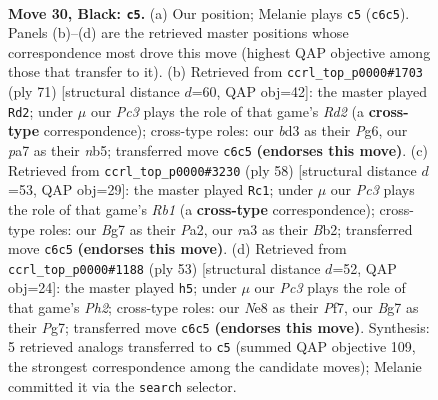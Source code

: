 \documentclass[11pt]{article}
\begin{document}
\clearpage

\begin{figure}[p]\centering
\begin{subfigure}{0.46\textwidth}\centering
\resizebox{\linewidth}{!}{%
\newchessgame
\chessboard[
  setfen={r3n3/P4kb1/1pp3p1/8/6pP/R2B4/3NR2K/2r5 b - - 1 30},
  showmover=false,
  pgfstyle=straightmove, color=movearrow, markmove={c6-c5}
]}
\caption{}
\end{subfigure}\hfill
\begin{subfigure}{0.46\textwidth}\centering
\resizebox{\linewidth}{!}{%
\newchessgame
\chessboard[
  setfen={6k1/3r3n/6p1/RN2r2p/1Pp5/5PP1/7P/1R3K2 b - - 0 36},
  showmover=false,
  pgfstyle=straightmove, color=movearrow, markmove={d7-d2}
]}
\caption{}
\end{subfigure}
\\[4pt]
\begin{subfigure}{0.46\textwidth}\centering
\resizebox{\linewidth}{!}{%
\newchessgame
\chessboard[
  setfen={2k5/2r2p1p/p1nRp3/8/P7/8/PB2KPrP/1R6 w - - 8 30},
  showmover=false,
  pgfstyle=straightmove, color=movearrow, markmove={b1-c1}
]}
\caption{}
\end{subfigure}\hfill
\begin{subfigure}{0.46\textwidth}\centering
\resizebox{\linewidth}{!}{%
\newchessgame
\chessboard[
  setfen={4r1k1/2R2ppp/p1N5/8/P3P3/7P/1r1n2P1/4R1K1 b - - 0 27},
  showmover=false,
  pgfstyle=straightmove, color=movearrow, markmove={h7-h5}
]}
\caption{}
\end{subfigure}
\caption{\textbf{Move 30, Black: \texttt{c5}.} (a) Our position; Melanie plays \texttt{c5} (\texttt{c6c5}). Panels (b)--(d) are the retrieved master positions whose correspondence most drove this move (highest QAP objective among those that transfer to it). (b) Retrieved from \texttt{ccrl\_top\_p0000\#1703} (ply 71) [structural distance $d$=60, QAP obj=42]: the master played \texttt{Rd2}; under $\mu$ our \emph{Pc3} plays the role of that game's \emph{Rd2} (a \textbf{cross-type} correspondence); cross-type roles: our \emph{b}d3 as their \emph{P}g6, our \emph{p}a7 as their \emph{n}b5; transferred move \texttt{c6c5} \textbf{(endorses this move)}. (c) Retrieved from \texttt{ccrl\_top\_p0000\#3230} (ply 58) [structural distance $d$=53, QAP obj=29]: the master played \texttt{Rc1}; under $\mu$ our \emph{Pc3} plays the role of that game's \emph{Rb1} (a \textbf{cross-type} correspondence); cross-type roles: our \emph{B}g7 as their \emph{P}a2, our \emph{r}a3 as their \emph{B}b2; transferred move \texttt{c6c5} \textbf{(endorses this move)}. (d) Retrieved from \texttt{ccrl\_top\_p0000\#1188} (ply 53) [structural distance $d$=52, QAP obj=24]: the master played \texttt{h5}; under $\mu$ our \emph{Pc3} plays the role of that game's \emph{Ph2}; cross-type roles: our \emph{N}e8 as their \emph{P}f7, our \emph{B}g7 as their \emph{P}g7; transferred move \texttt{c6c5} \textbf{(endorses this move)}. Synthesis: 5 retrieved analogs transferred to \texttt{c5} (summed QAP objective 109, the strongest correspondence among the candidate moves); Melanie committed it via the \texttt{search} selector.}
\label{fig:thought-m59}
\end{figure}
\end{document}
